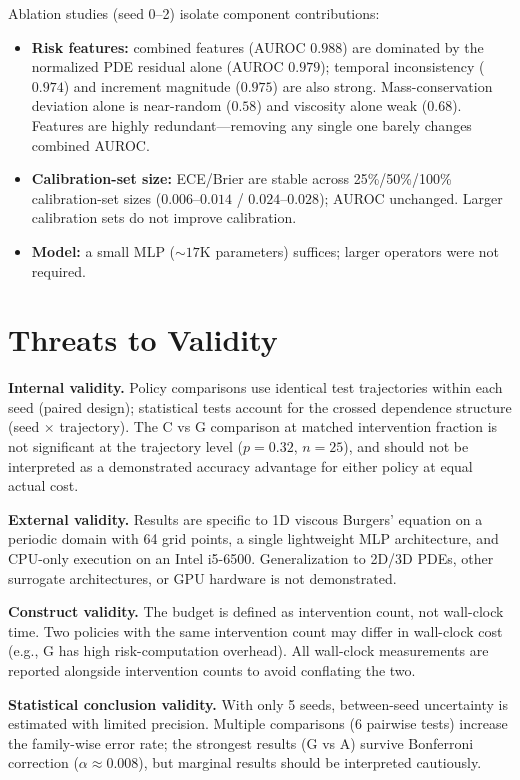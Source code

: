 \documentclass[11pt]{article}
\begin{document}
Ablation studies (seed 0--2) isolate component contributions:
\begin{itemize}
\item \textbf{Risk features:} combined features (AUROC $0.988$) are dominated by the normalized PDE residual alone (AUROC $0.979$); temporal inconsistency ($0.974$) and increment magnitude ($0.975$) are also strong. Mass-conservation deviation alone is near-random ($0.58$) and viscosity alone weak ($0.68$). Features are highly redundant---removing any single one barely changes combined AUROC.
\item \textbf{Calibration-set size:} ECE/Brier are stable across 25\%/50\%/100\% calibration-set sizes ($0.006$--$0.014$ / $0.024$--$0.028$); AUROC unchanged. Larger calibration sets do not improve calibration.
\item \textbf{Model:} a small MLP ($\sim 17$K parameters) suffices; larger operators were not required.
\end{itemize}

\section{Threats to Validity}
\label{sec:threats}

\textbf{Internal validity.} Policy comparisons use identical test trajectories within each seed (paired design); statistical tests account for the crossed dependence structure (seed $\times$ trajectory). The C vs G comparison at matched intervention fraction is not significant at the trajectory level ($p=0.32$, $n=25$), and should not be interpreted as a demonstrated accuracy advantage for either policy at equal actual cost.

\textbf{External validity.} Results are specific to 1D viscous Burgers' equation on a periodic domain with 64 grid points, a single lightweight MLP architecture, and CPU-only execution on an Intel i5-6500. Generalization to 2D/3D PDEs, other surrogate architectures, or GPU hardware is not demonstrated.

\textbf{Construct validity.} The budget is defined as intervention count, not wall-clock time. Two policies with the same intervention count may differ in wall-clock cost (e.g., G has high risk-computation overhead). All wall-clock measurements are reported alongside intervention counts to avoid conflating the two.

\textbf{Statistical conclusion validity.} With only 5 seeds, between-seed uncertainty is estimated with limited precision. Multiple comparisons (6 pairwise tests) increase the family-wise error rate; the strongest results (G vs A) survive Bonferroni correction ($\alpha \approx 0.008$), but marginal results should be interpreted cautiously.
\end{document}
